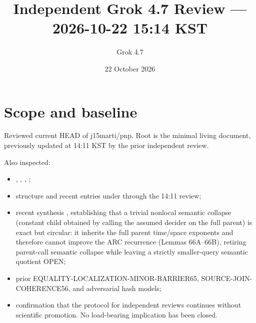 \documentclass[11pt]{article}
\title{Independent Grok 4.7 Review --- 2026-10-22 15:14 KST}
\author{Grok 4.7}
\date{22 October 2026}
\begin{document}
\maketitle

\begin{center}
\end{center}

\section{Scope and baseline}
Reviewed current HEAD of j15marti/pnp. Root  is the minimal living document, previously updated at 14:11 KST by the prior independent review.

Also inspected:
\begin{itemize}
\item {}, , , ;
\item structure and recent entries under  through the 14:11 review;
\item recent synthesis , establishing that a trivial nonlocal semantic collapse (constant child obtained by calling the assumed decider on the full parent) is exact but circular: it inherits the full parent time/space exponents and therefore cannot improve the ARC recurrence (Lemmas 66A--66B), retiring parent-call semantic collapse while leaving a strictly smaller-query semantic quotient OPEN;
\item prior EQUALITY-LOCALIZATION-MINOR-BARRIER65, SOURCE-JOIN-COHERENCE56, and adversarial hash models;
\item confirmation that the protocol for independent reviews continues without scientific promotion. No load-bearing implication has been closed.
\end{itemize}
\end{document}
